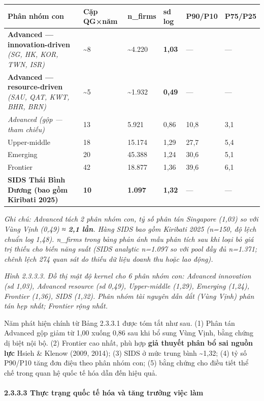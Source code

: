 \documentclass[12pt,a4paper]{article}
\begin{document}
\begin{longtable}[]{@{}llllll@{}}
\toprule\noalign{}
Phân nhóm con & Cặp QG×năm & n\_firms & sd log & P90/P10 & P75/P25 \\
\midrule\noalign{}
\endhead
\bottomrule\noalign{}
\endlastfoot
\textbf{Advanced --- innovation-driven} \emph{(SG, HK, KOR, TWN, ISR)} &
\textasciitilde8 & \textasciitilde4.220 & \textbf{1,03} & --- & --- \\
\textbf{Advanced --- resource-driven} \emph{(SAU, QAT, KWT, BHR, BRN)} &
\textasciitilde5 & \textasciitilde1.932 & \textbf{0,49} & --- & --- \\
\emph{Advanced (gộp --- tham chiếu)} & 13 & 5.921 & 0,86 & 10,8 & 3,1 \\
Upper-middle & 18 & 15.174 & 1,29 & 27,7 & 5,4 \\
Emerging & 20 & 45.388 & 1,24 & 30,6 & 5,1 \\
Frontier & 42 & 18.877 & 1,36 & 39,6 & 6,1 \\
\textbf{SIDS Thái Bình Dương (bao gồm Kiribati 2025)} & \textbf{10} &
\textbf{1.097} & \textbf{1,32} & --- & --- \\
\end{longtable}

\emph{Ghi chú: Advanced tách 2 phân nhóm con, tỷ số phân tán Singapore
(1,03) so với Vùng Vịnh (0,49) ≈ \textbf{2,1 lần}. Hàng SIDS bao gồm
Kiribati 2025 (n=150, độ lệch chuẩn log 1,48). n\_firms trong bảng phản
ánh mẫu phân tích sau khi loại bỏ giá trị thiếu cho biến năng suất (SIDS
analytic n=1.097 so với pool đầy đủ n=1.371; chênh lệch 274 quan sát do
thiếu dữ liệu doanh thu hoặc lao động).}

\emph{Hình 2.3.3.3. Đồ thị mật độ kernel cho 6 phân nhóm con: Advanced
innovation (sd 1,03), Advanced resource (sd 0,49), Upper-middle (1,29),
Emerging (1,24), Frontier (1,36), SIDS (1,32). Phân nhóm tài nguyên dẫn
dắt (Vùng Vịnh) phân tán hẹp nhất; Frontier rộng nhất.}

Năm phát hiện chính từ Bảng 2.3.3.1 được tóm tắt như sau. (1) Phân tán
Advanced gộp giảm từ 1,00 xuống 0,86 sau khi bổ sung Vùng Vịnh, bằng
chứng dị biệt nội bộ. (2) Frontier cao nhất, phù hợp \textbf{giả thuyết
phân bổ sai nguồn lực} Hsieh \& Klenow (2009, 2014); (3) SIDS ở mức
trung bình \textasciitilde1,32; (4) tỷ số P90/P10 tăng đơn điệu theo
phân nhóm con; (5) bằng chứng cho điều tiết thể chế trong quan hệ quốc
tế hóa dẫn đến hiệu quả.

\hypertarget{2333-thux1ef1c-trux1ea1ng-quux1ed1c-tux1ebf-huxf3a-vuxe0-tux103ng-trux1b0ux1edfng-viux1ec7c-luxe0m}{%
\paragraph{2.3.3.3 Thực trạng quốc tế hóa và tăng trưởng việc
làm}\label{2333-thux1ef1c-trux1ea1ng-quux1ed1c-tux1ebf-huxf3a-vuxe0-tux103ng-trux1b0ux1edfng-viux1ec7c-luxe0m}}
\end{document}
